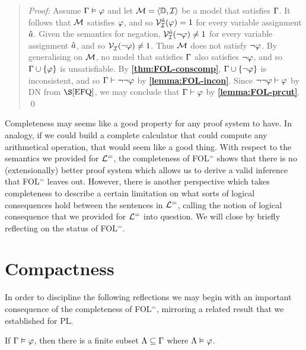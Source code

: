 \begin{quote} 
  \textit{Proof:} Assume $\Gamma\vDash\varphi$ and let $\mathcal{M}=\langle\mathbb{D},\mathcal{I}\rangle$ be a model that satisfies $\Gamma$.
  It follows that $\mathcal{M}$ satisfies $\varphi$, and so $\mathcal{V}_{\mathcal{I}}^{\hat{a}}(\varphi)=1$ for every variable assignment $\hat{a}$.
  Given the semantics for negation, $\mathcal{V}_{\mathcal{I}}^{\hat{a}}(\neg\varphi)\neq 1$ for every variable assignment $\hat{a}$, and so $\mathcal{V}_{\mathcal{I}}^{}(\neg\varphi)\neq 1$.
  Thus $\mathcal{M}$ does not satisfy $\neg\varphi$.
  By generalising on $\mathcal{M}$, no model that satisfies $\Gamma$ also satisfies $\neg\varphi$, and so $\Gamma\cup\lbrace\varphi\rbrace$ is unsatisfiable. 
  By \textbf{\ref{thm:FOL-conscomp}}, $\Gamma\cup\lbrace\neg\varphi\rbrace$ is inconsistent, and so $\Gamma\vdash\neg\neg\varphi$ by \textbf{\ref{lemma:FOL-incon}}.
  Since $\neg\neg\varphi\vdash\varphi$ by DN from $\S\ref{EFQ}$, we may conclude that $\Gamma\vdash\varphi$ by \textbf{\ref{lemma:FOL-prcut}}.
  \qed
\end{quote}

Completeness may seems like a good property for any proof system to have.
In analogy, if we could build a complete calculator that could compute any arithmetical operation, that would seem like a good thing.
With respect to the semantics we provided for $\mathcal{L}^{=}$, the completeness of FOL$^=$ shows that there is no (extensionally) better proof system which allows us to derive a valid inference that FOL$^=$ leaves out.
However, there is another perspective which takes completeness to describe a certain limitation on what sorts of logical consequences hold between the sentences in $\mathcal{L}^{=}$, calling the notion of logical consequence that we provided for $\mathcal{L}^{=}$ into question.
We will close by briefly reflecting on the status of FOL$^=$. %






\section{Compactness}%
  \label{sec:Compactness}

In order to discipline the following reflections we may begin with an important consequence of the completeness of FOL$^=$, mirroring a related result that we established for PL.

\begin{Cthm} \label{cor:compact}
  If $\Gamma\vDash\varphi$, then there is a finite subset $\Lambda\subseteq\Gamma$ where $\Lambda\vDash\varphi$.
\end{Cthm}

